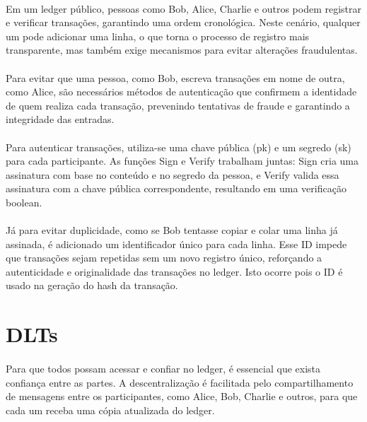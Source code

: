 \documentclass[letterpaper,11pt,leqno]{article}
\begin{document}
\paragraph{}
Em um ledger público, pessoas como Bob, Alice, Charlie e outros podem registrar
e verificar transações, garantindo uma ordem cronológica. Neste cenário,
qualquer um pode adicionar uma linha, o que torna o processo de registro mais
transparente, mas também exige mecanismos para evitar alterações fraudulentas.

\paragraph{}
Para evitar que uma pessoa, como Bob, escreva transações em nome de outra, como
Alice, são necessários métodos de autenticação que confirmem a identidade de
quem realiza cada transação, prevenindo tentativas de fraude e garantindo a
integridade das entradas.

\paragraph{}
Para autenticar transações, utiliza-se uma chave pública (pk) e um segredo (sk)
para cada participante. As funções Sign e Verify trabalham juntas: Sign cria uma
assinatura com base no conteúdo e no segredo da pessoa, e Verify valida essa
assinatura com a chave pública correspondente, resultando em uma verificação
boolean.

\paragraph{}
Já para evitar duplicidade, como se Bob tentasse copiar e colar uma linha já
assinada, é adicionado um identificador único para cada linha. Esse ID impede
que transações sejam repetidas sem um novo registro único, reforçando a
autenticidade e originalidade das transações no ledger. Isto ocorre pois o ID é
usado na geração do hash da transação.

\section{DLTs}

\paragraph{}
Para que todos possam acessar e confiar no ledger, é essencial que exista
confiança entre as partes. A descentralização é facilitada pelo compartilhamento
de mensagens entre os participantes, como Alice, Bob, Charlie e outros, para que
cada um receba uma cópia atualizada do ledger.
\end{document}
